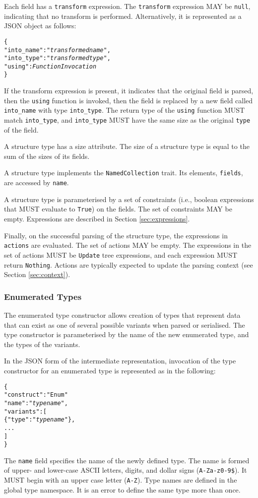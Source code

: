 \documentclass[10pt,twocolumn,a4paper]{article}
\newcommand{\code}[1]{\texttt{#1}}
\begin{document}
Each field has a \code{transform} expression.
The \code{transform} expression MAY be \code{null}, indicating that no
transform is performed.
Alternatively, it is represented as a JSON object as follows:
\footnotesize
\begin{alltt}
  \{
    "into\_name" : "\emph{transformed name}",
    "into\_type" : "\emph{transformed type}",
    "using"      : \emph{FunctionInvocation}
  \}
\end{alltt}
\normalsize
If the transform expression is present, it indicates that the original
field is parsed, then the \code{using} function is invoked, then the field
is replaced by a new field called \code{into\_name} with type \code{into\_type}.
The return type of the \code{using} function MUST match \code{into\_type},
and \code{into\_type} MUST have the same size as the original \code{type}
of the field.

A structure type has a size attribute. The size of a structure type is
equal to the sum of the sizes of its fields.

A structure type implements the \code{NamedCollection} trait. Its elements,
\code{fields}, are accessed by \code{name}.

A structure type is parameterised by a set of constraints (i.e., boolean
expressions that MUST evaluate to \code{True}) on the
fields. The set of constraints MAY be empty. Expressions are described in
Section \ref{sec:expressions}.

Finally, on the successful parsing of the structure type, the expressions
in \code{actions} are evaluated. The set of actions MAY be empty. The
expressions in the set of actions MUST be \code{Update} tree expressions,
and each expression MUST return \code{Nothing}. Actions are typically
expected to update the parsing context (see Section \ref{sec:context}).

\subsubsection{Enumerated Types}

The enumerated type constructor allows creation of types that represent
data that can exist as one of several possible variants when parsed or
serialised. The type constructor is parameterised by the name of the new
enumerated type, and the types of the variants.

In the JSON form of the intermediate representation, invocation of the type
constructor for an enumerated type is represented as in the following:
\footnotesize
\begin{alltt}
  \{
    "construct"   : "Enum"
    "name"        : "\emph{type name}",
    "variants"    : [
      \{"type" : "\emph{type name}"\},
      ...
    ]
  \}
\end{alltt}
\normalsize
The \code{name} field specifies the name of the newly defined type. The
name is formed of upper- and lower-case ASCII letters, digits, and dollar
signs (\code{A-Za-z0-9\$}).  It MUST begin with an upper case letter
(\code{A-Z}). Type names are defined in the global type namespace.
It is an error to define the same type more than once.
\end{document}
